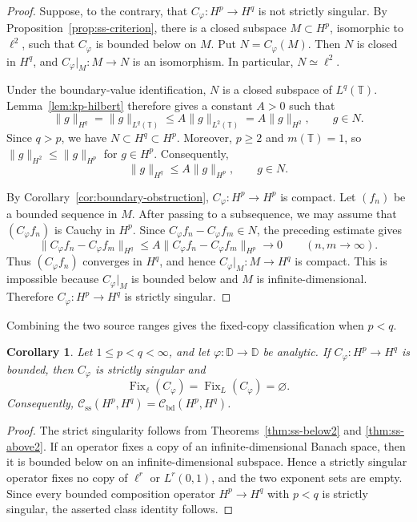 \documentclass[11pt, reqno]{amsart}
\newtheorem{corollary}[theorem]{Corollary}
\theoremstyle{definition}
\theoremstyle{remark}
\newcommand{\D}{\mathbb{D}}
\newcommand{\T}{\mathbb{T}}
\newcommand{\CB}{\mathcal C_{\mathrm{bd}}}
\newcommand{\CS}{\mathcal C_{\mathrm{ss}}}
\begin{document}
\begin{proof}
Suppose, to the contrary, that \(C_\varphi:H^p\to H^q\) is not
strictly singular. By Proposition~\ref{prop:ss-criterion}, there is a
closed subspace \(M\subset H^p\), isomorphic to \(\ell^2\), such that
\(C_\varphi\) is bounded below on \(M\). Put \(N=C_\varphi(M)\).
Then \(N\) is closed in \(H^q\), and
\(C_\varphi|_M:M\to N\) is an isomorphism. In particular,
\(N\simeq\ell^2\).

Under the boundary-value identification, \(N\) is a closed subspace of
\(L^q(\T)\). Lemma~\ref{lem:kp-hilbert} therefore
gives a constant \(A>0\) such that
\[
        \|g\|_{H^q}
        =
        \|g\|_{L^q(\T)}
        \le
        A\|g\|_{L^2(\T)}
        =
        A\|g\|_{H^2},
        \qquad
        g\in N.
\]
Since \(q>p\), we have \(N\subset H^q\subset H^p\). Moreover,
\(p\ge2\) and \(m(\T)=1\), so
\(\|g\|_{H^2}\le\|g\|_{H^p}\) for \(g\in H^p\). Consequently,
\[
        \|g\|_{H^q}
        \le
        A\|g\|_{H^p},
        \qquad
        g\in N.
\]

By Corollary~\ref{cor:boundary-obstruction},
\(C_\varphi:H^p\to H^p\) is compact. Let \((f_n)\) be a bounded
sequence in \(M\). After passing to a subsequence, we may assume that
\((C_\varphi f_n)\) is Cauchy in \(H^p\). Since
\(C_\varphi f_n-C_\varphi f_m\in N\), the preceding estimate gives
\[
        \|C_\varphi f_n-C_\varphi f_m\|_{H^q}
        \le
        A\|C_\varphi f_n-C_\varphi f_m\|_{H^p}
        \longrightarrow0
        \qquad (n,m\to\infty).
\]
Thus \((C_\varphi f_n)\) converges in \(H^q\), and hence
\(C_\varphi|_M:M\to H^q\) is compact. This is impossible because
\(C_\varphi|_M\) is bounded below and \(M\) is infinite-dimensional.
Therefore \(C_\varphi:H^p\to H^q\) is strictly singular.
\end{proof}

Combining the two source ranges gives the fixed-copy classification when \(p<q\).

\begin{corollary}
\label{cor:p-lt-q}
Let \(1\le p<q<\infty\), and let \(\varphi:\D\to\D\) be analytic.
If \(C_\varphi:H^p\to H^q\) is bounded, then \(C_\varphi\) is strictly
singular and
\[
        \operatorname{Fix}_{\ell}(C_\varphi)
        =
        \operatorname{Fix}_{L}(C_\varphi)
        =
        \varnothing.
\]
Consequently,
\(\CS(H^p,H^q)=\CB(H^p,H^q)\).
\end{corollary}

\begin{proof}
The strict singularity follows from
Theorems~\ref{thm:ss-below2} and
\ref{thm:ss-above2}.  If an operator fixes a copy of an
infinite-dimensional Banach space, then it is bounded below on an
infinite-dimensional subspace.  Hence a strictly singular operator fixes
no copy of \(\ell^r\) or \(L^r(0,1)\), and the two exponent sets are
empty.  Since every bounded composition operator \(H^p\to H^q\) with
\(p<q\) is strictly singular,  the asserted class identity follows.
\end{proof}
\end{document}
